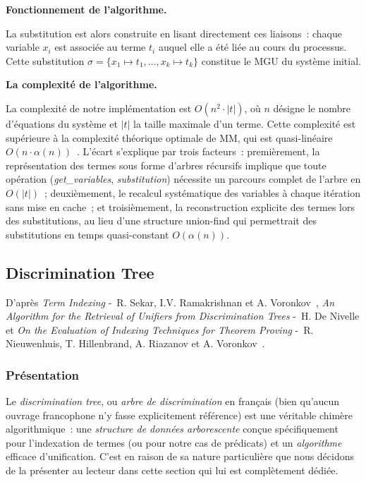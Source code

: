 \documentclass[11pt]{article}
\newenvironment{avantpropos}{%
    \begin{mdframed}[
        linecolor=sectioncolor!40,
        linewidth=0.8pt,
        backgroundcolor=sectioncolor!5,
        innerleftmargin=10pt,
        innerrightmargin=10pt,
        innertopmargin=6pt,
        innerbottommargin=6pt,
        skipabove=8pt,
        skipbelow=8pt
    ]
    \noindent\textbf{\small\color{sectioncolor}}\enspace\small\itshape
}{%
    \end{mdframed}
}
\newenvironment{paraph}[1]{%
  \medskip
  \noindent\textbf{#1.}\quad

  \vspace{0.2cm}
}{%
  \medskip
}
\begin{document}
\begin{paraph}{Fonctionnement de l'algorithme}
    \vspace{0.2cm}
    La substitution est alors construite 
    en lisant directement ces liaisons~: chaque variable $x_i$ 
    est associée au terme $t_i$ auquel elle a été liée au cours 
    du processus. Cette substitution 
    $\sigma = \{x_1 \mapsto t_1, \dots, x_k \mapsto t_k\}$ constitue 
    le MGU du système initial.

    
    \vspace{0.2cm}
    \begin{paraph}{La complexité de l'algorithme}
        La complexité de notre implémentation est $O(n^2 \cdot |t|)$, 
    où $n$ désigne le nombre d'équations du système et $|t|$ la 
    taille maximale d'un terme. Cette complexité est supérieure 
    à la complexité théorique optimale de MM, qui est quasi-linéaire 
    $O(n \cdot \alpha(n))$~\cite{martelli1982efficient}. L'écart s'explique 
    par trois facteurs~: premièrement, la représentation des termes 
    sous forme d'arbres récursifs implique que toute opération 
    (\textit{get\_variables}, \textit{substitution}) nécessite un 
    parcours complet de l'arbre en $O(|t|)$~; deuxièmement, le 
    recalcul systématique des variables à chaque itération sans 
    mise en cache~; et troisièmement, la reconstruction explicite 
    des termes lors des substitutions, au lieu d'une structure 
    union-find qui permettrait des substitutions en temps 
    quasi-constant $O(\alpha(n))$.
    \end{paraph}

\end{paraph}
\newpage
\subsection{Discrimination Tree}\label{sec:dt}

\begin{avantpropos}
    D'après \emph{Term Indexing} -~R. Sekar, I.V. Ramakrishnan et A. Voronkov~\cite{TermIndexing}, \emph{An Algorithm for the Retrieval of Unifiers from
    Discrimination Trees} -~H. De Nivelle \cite{DT} et \emph{On the Evaluation of Indexing Techniques for Theorem Proving} -~R. Nieuwenhuis, T. Hillenbrand,
    A. Riazanov et A. Voronkov~\cite{Eval}.
\end{avantpropos}

\subsubsection{Présentation}
Le \textit{discrimination tree}, ou \textit{arbre de discrimination} en français (bien 
qu'aucun ouvrage francophone n'y fasse explicitement référence) est une véritable 
chimère algorithmique~: une \textit{structure de données arborescente} conçue 
spécifiquement pour l'indexation de termes (ou pour notre cas de prédicats) et 
un \textit{algorithme} efficace d'unification. C'est en raison de sa nature 
particulière que nous décidons de la présenter au lecteur dans cette section 
qui lui est complètement dédiée.
\end{document}
